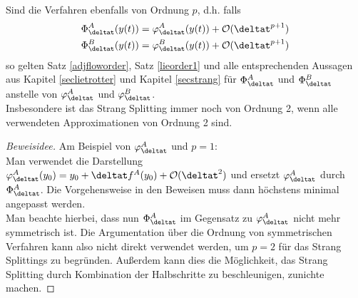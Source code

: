 \begin{maththeorem}
Sind die Verfahren ebenfalls von Ordnung $p$, d.h. falls 
\begin{align*}
\Phi_{\deltat}^A(y(t))=\varphi_{\deltat}^A(y(t))+\mathcal{O}(\deltat^{p+1})\\
\Phi_{\deltat}^B(y(t))=\varphi_{\deltat}^B(y(t))+\mathcal{O}(\deltat^{p+1})
\end{align*}
so gelten Satz \ref{adjfloworder}, Satz \ref{lieorder1} und alle entsprechenden Aussagen aus Kapitel \ref{seclietrotter} und Kapitel \ref{secstrang} für $\Phi_{\deltat}^A$ und $\Phi_{\deltat}^B$ anstelle von $\varphi_{\deltat}^A$ und $\varphi_{\deltat}^B$.\\
Insbesondere ist das Strang Splitting immer noch von Ordnung 2, wenn alle verwendeten Approximationen von Ordnung 2 sind.
\end{maththeorem}
\begin{proof}[Beweisidee]
Am Beispiel von $\varphi_{\deltat}^A$ und $p=1$:\\
Man verwendet die Darstellung $\varphi_{\deltat}^A(y_0)=y_0+\deltat f^A(y_0)+\mathcal{O}(\deltat^2)$ und ersetzt $\varphi_{\deltat}^A$ durch $\Phi_{\deltat}^A$. Die Vorgehensweise in den Beweisen muss dann höchstens minimal angepasst werden.\\
Man beachte hierbei, dass nun $\Phi_{\deltat}^A$ im Gegensatz zu $\varphi_{\deltat}^A$ nicht mehr symmetrisch ist. Die Argumentation über die Ordnung von symmetrischen Verfahren kann also nicht direkt verwendet werden, um $p=2$ für das Strang Splittings zu begründen. Außerdem kann dies die Möglichkeit, das Strang Splitting durch Kombination der Halbschritte zu beschleunigen, zunichte machen.
\end{proof}

